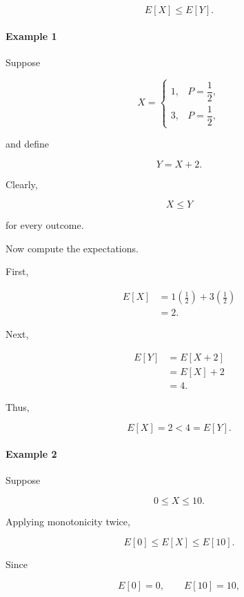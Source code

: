 \documentclass[11pt]{article}
\begin{document}
\begin{mdframed}[
		linewidth=0.8pt,
		roundcorner=6pt,
		backgroundcolor=gray!5,
		linecolor=gray!60,
		innertopmargin=10pt,
		innerbottommargin=10pt,
		innerleftmargin=10pt,
		innerrightmargin=10pt
		]
		\[
		\boxed{
			E[X]\le E[Y].
		}
		\]
		
		\bigskip
		
		\paragraph{Example 1}
		
		Suppose
		
		\[
		X=
		\begin{cases}
			1,&P=\dfrac12,\\
			3,&P=\dfrac12,
		\end{cases}
		\]
		
		and define
		
		\[
		Y=X+2.
		\]
		
		Clearly,
		
		\[
		X\le Y
		\]
		
		for every outcome.
		
		Now compute the expectations.
		
		First,
		
		\[
		\begin{aligned}
			E[X]
			&=
			1\left(\frac12\right)
			+
			3\left(\frac12\right)
			\\[0.3cm]
			&=
			2.
		\end{aligned}
		\]
		
		Next,
		
		\[
		\begin{aligned}
			E[Y]
			&=
			E[X+2]
			\\[0.3cm]
			&=
			E[X]+2
			\\[0.3cm]
			&=
			4.
		\end{aligned}
		\]
		
		Thus,
		
		\[
		\boxed{
			E[X]=2<4=E[Y].
		}
		\]
		
		\bigskip
		
		\paragraph{Example 2}
		
		Suppose
		
		\[
		0\le X\le10.
		\]
		
		Applying monotonicity twice,
		
		\[
		E[0]
		\le
		E[X]
		\le
		E[10].
		\]
		
		Since
		
		\[
		E[0]=0,
		\qquad
		E[10]=10,
		\]
		

\end{mdframed}
\end{document}
